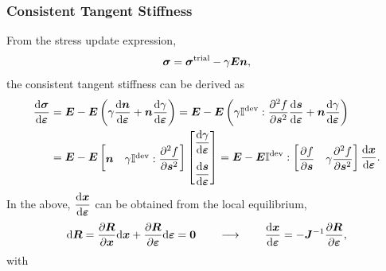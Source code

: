 \subsubsection{Consistent Tangent Stiffness}
From the stress update expression,
\begin{gather}
    \bm{\sigma}=\bm{\sigma}^\text{trial}-\gamma\bm{E}\bm{n},
\end{gather}
the consistent tangent stiffness can be derived as
\begin{gather}
    \begin{split}
        \dfrac{\mathrm{d}\bm{\sigma}}{\mathrm{d}\bm{\varepsilon}} & =\bm{E}-\bm{E}\left(\gamma\dfrac{\mathrm{d}\bm{n}}{\mathrm{d}\bm{\varepsilon}}+\bm{n}\dfrac{\mathrm{d}\gamma}{\mathrm{d}\bm{\varepsilon}}\right)=\bm{E}-\bm{E}\left(\gamma\mathbb{I}^\text{dev}:\dfrac{\partial{^2f}}{\partial{\bm{s}^2}}\dfrac{\mathrm{d}\bm{s}}{\mathrm{d}\bm{\varepsilon}}+\bm{n}\dfrac{\mathrm{d}\gamma}{\mathrm{d}\bm{\varepsilon}}\right) \\
                                       & =\bm{E}-\bm{E}\begin{bmatrix}
                                                           \bm{n} & \gamma\mathbb{I}^\text{dev}:\dfrac{\partial{^2f}}{\partial{\bm{s}^2}}
                                                       \end{bmatrix}\begin{bmatrix}
                                                                        \dfrac{\mathrm{d}\gamma}{\mathrm{d}\bm{\varepsilon}} \\[4mm]
                                                                        \dfrac{\mathrm{d}\bm{s}}{\mathrm{d}\bm{\varepsilon}}
                                                                    \end{bmatrix}=\bm{E}-\bm{E}\mathbb{I}^\text{dev}:\begin{bmatrix}
                                                                                                                         \dfrac{\partial{f}}{\partial{\bm{s}}} & \gamma\dfrac{\partial{^2f}}{\partial{\bm{s}^2}}
                                                                                                                     \end{bmatrix}\dfrac{\mathrm{d}\bm{x}}{\mathrm{d}\bm{\varepsilon}}.
    \end{split}
\end{gather}
In the above, $\dfrac{\mathrm{d}\bm{x}}{\mathrm{d}\bm{\varepsilon}}$ can be obtained from the local equilibrium,
\begin{gather}
    \mathrm{d}\bm{R}=\dfrac{\partial{\bm{R}}}{\partial{\bm{x}}}\mathrm{d}\bm{x}+\dfrac{\partial{\bm{R}}}{\partial{\bm{\varepsilon}}}\mathrm{d}\bm{\varepsilon}=\bm{0}\qquad\longrightarrow\qquad\dfrac{\mathrm{d}\bm{x}}{\mathrm{d}\bm{\varepsilon}}=-\bm{J}^{-1}\dfrac{\partial{\bm{R}}}{\partial{\bm{\varepsilon}}},
\end{gather}
with
